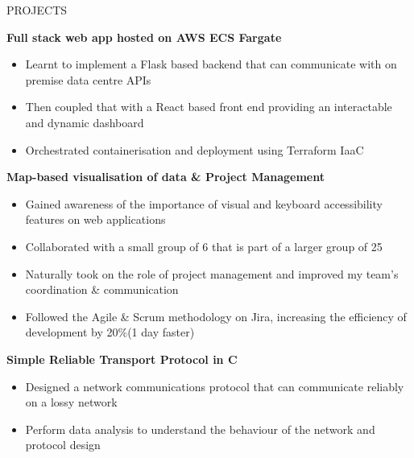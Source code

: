 \documentclass{resume} %
\begin{document}
\begin{rSection}{PROJECTS}

\textbf{Full stack web app hosted on AWS ECS Fargate} 
\vspace*{-5pt}
\begin{itemize}
    \itemsep -5pt {} 
    \item Learnt to implement a Flask based backend that can communicate with on premise data centre APIs
    \item Then coupled that with a React based front end providing an interactable and dynamic dashboard
    \item Orchestrated containerisation and deployment using Terraform IaaC
\end{itemize}


\textbf{Map-based visualisation of data \& Project Management} 
\vspace*{-5pt}
\begin{itemize}
    \itemsep -5pt {} 
    \item Gained awareness of the importance of visual and keyboard accessibility features on web applications
    \item Collaborated with a small group of 6 that is part of a larger group of 25
    \item Naturally took on the role of project management and improved my team's coordination \& communication
    \item Followed the Agile \& Scrum methodology on Jira, increasing the efficiency of development by 20\%(1 day faster) 
\end{itemize}

\textbf{Simple Reliable Transport Protocol in C}
\vspace*{-5pt}
\begin{itemize}
    \itemsep -5pt {} 
    \item Designed a network communications protocol that can communicate reliably on a lossy network 
    \item Perform data analysis to understand the behaviour of the network and protocol design
\end{itemize}


\end{rSection}
\end{document}
